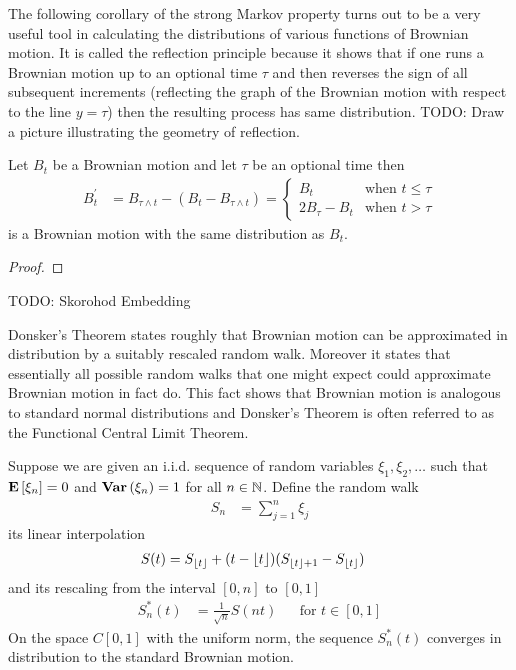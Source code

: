 The following corollary of the strong Markov property turns out to be
a very useful tool in calculating the distributions of various
functions of Brownian motion.  It is called the reflection principle
because it shows that if one runs a Brownian motion up to an optional
time $\tau$ and then reverses the sign of all subsequent increments
(reflecting the graph of the Brownian motion with respect to the line
$y=\tau$) then the resulting process has same distribution.  TODO: Draw a picture illustrating the
geometry of reflection.
\begin{lem}\label{ReflectionPrinciple}Let $B_t$ be a Brownian motion and let $\tau$ be an
  optional time then 
\begin{align*}
B^\prime_t &= B_{\tau \wedge t} - (B_t - B_{\tau \wedge t}) = \begin{cases}
B_t & \text{when $t \leq \tau$} \\
2 B_\tau - B_t & \text{when $t > \tau$}
\end{cases}
\end{align*}
is a Brownian motion with the same distribution as $B_t$.
\end{lem}
\begin{proof}

\end{proof}

TODO: Skorohod Embedding


Donsker's Theorem states roughly that Brownian motion can be
approximated in distribution by a suitably rescaled random walk.
Moreover it states that essentially all possible random walks that one
might expect could approximate Brownian motion in fact do.  This fact
shows that Brownian motion is analogous to standard normal
distributions and Donsker's Theorem is often referred to as the
Functional Central Limit Theorem.

\begin{thm}\label{DonskersTheorem}
Suppose we are given an i.i.d. sequence of random variables $\xi_1,
\xi_2, \dotsc$ such that $\textbf{E}\left[\xi_n\right]=0$ and
$\textbf{Var} \left (\xi_n \right )=1$ for all $n \in \mathbb{N}$.  Define the random
walk 
\begin{align*}
S_n &= \sum_{j=1}^n \xi_j
\end{align*}
its linear interpolation
\begin{align*}
S(t) &= S_{\lfloor t \rfloor} + (t - \lfloor t \rfloor)(S_{\lfloor t \rfloor+1} - S_{\lfloor t \rfloor})
\end{align*}
and its rescaling from the interval $[0,n]$ to $[0,1]$
\begin{align*}
S_n^*(t) &= \frac{1}{\sqrt{n}} S(nt) & & \text{for $t\in [0,1]$}
\end{align*}
On the space $C[0,1]$ with the uniform norm, the sequence $S^*_n(t)$
converges in distribution to the standard Brownian motion.
\end{thm}

